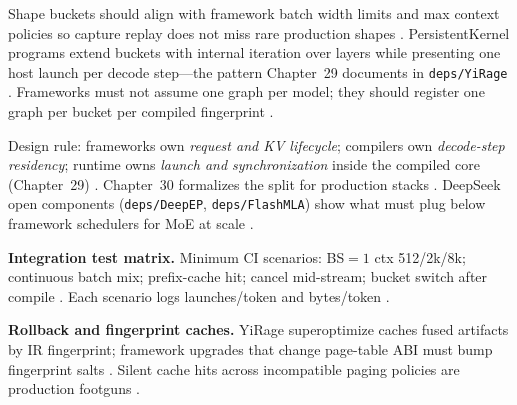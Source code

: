 Shape buckets should align with framework batch width limits and max context policies so capture replay does not miss rare production shapes \citep{nvidia2024cudagraphs,kwon2023vllm,patel2025llminference,memoryfloor2026,yirage2026,chen2020compilerbasedhardw,taxbreak2026,dao2022flashattention,liu2024deepseekv3,semianalysis2024tma,amd2024xdna,amd2024aie,dao2023flashdecoding,nvidia2022hopper,dlbook}. PersistentKernel programs extend buckets with internal iteration over layers while presenting one host launch per decode step---the pattern Chapter~29 documents in \texttt{deps/YiRage} \citep{yirage2026,chen2020compilerbasedhardw,nvidia2024cudagraphs,kwon2023vllm,patel2025llminference,memoryfloor2026,taxbreak2026,dao2022flashattention,dlbook}. Frameworks must not assume one graph per model; they should register one graph per bucket per compiled fingerprint \citep{nvidia2024cudagraphs,yirage2026,chen2020compilerbasedhardw,kwon2023vllm,patel2025llminference,memoryfloor2026,taxbreak2026,dlbook}.

Design rule: frameworks own \emph{request and KV lifecycle}; compilers own \emph{decode-step residency}; runtime owns \emph{launch and synchronization} inside the compiled core (Chapter~29) \citep{yirage2026,chen2020compilerbasedhardw,patel2025llminference,kwon2023vllm,taxbreak2026,memoryfloor2026,liu2024deepseekv3,nvidia2024cudagraphs,dao2022flashattention,dlbook,semianalysis2024tma,amd2024aie,amd2024xdna,dao2023flashdecoding,nvidia2022hopper}. Chapter~30 formalizes the split for production stacks \citep{yirage2026,chen2020compilerbasedhardw,patel2025llminference,dlbook}. DeepSeek open components (\texttt{deps/DeepEP}, \texttt{deps/FlashMLA}) show what must plug below framework schedulers for MoE at scale \citep{liu2024deepseekv3,yirage2026,chen2020compilerbasedhardw,patel2025llminference,kwon2023vllm,taxbreak2026,memoryfloor2026,dlbook}.

\textbf{Integration test matrix.} Minimum CI scenarios: BS${=}1$ ctx 512/2k/8k; continuous batch mix; prefix-cache hit; cancel mid-stream; bucket switch after compile \citep{kwon2023vllm,patel2025llminference,yirage2026,chen2020compilerbasedhardw,memoryfloor2026,nvidia2024cudagraphs,taxbreak2026,dao2022flashattention,liu2024deepseekv3,semianalysis2024tma,amd2024xdna,amd2024aie,dao2023flashdecoding,nvidia2022hopper,dlbook}. Each scenario logs launches/token and bytes/token \citep{taxbreak2026,memoryfloor2026,patel2025llminference,yirage2026,chen2020compilerbasedhardw,kwon2023vllm,dlbook}.

\textbf{Rollback and fingerprint caches.} YiRage superoptimize caches fused artifacts by IR fingerprint; framework upgrades that change page-table ABI must bump fingerprint salts \citep{yirage2026,chen2020compilerbasedhardw,kwon2023vllm,patel2025llminference,nvidia2024cudagraphs,memoryfloor2026,taxbreak2026,dao2022flashattention,liu2024deepseekv3,semianalysis2024tma,dlbook,amd2024aie,amd2024xdna,dao2023flashdecoding,nvidia2022hopper,dlbook}. Silent cache hits across incompatible paging policies are production footguns \citep{yirage2026,kwon2023vllm,patel2025llminference,chen2020compilerbasedhardw,memoryfloor2026,taxbreak2026,dlbook}.

